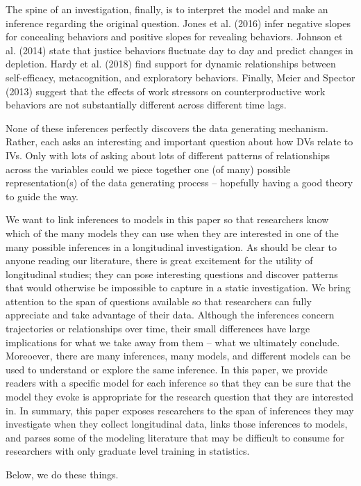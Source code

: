 \documentclass[english,,man]{apa6}
\theoremstyle{definition}
\theoremstyle{definition}
\theoremstyle{definition}
\theoremstyle{remark}
\begin{document}
The spine of an investigation, finally, is to interpret the model and
make an inference regarding the original question. Jones et al. (2016)
infer negative slopes for concealing behaviors and positive slopes for
revealing behaviors. Johnson et al. (2014) state that justice behaviors
fluctuate day to day and predict changes in depletion. Hardy et al.
(2018) find support for dynamic relationships between self-efficacy,
metacognition, and exploratory behaviors. Finally, Meier and Spector
(2013) suggest that the effects of work stressors on counterproductive
work behaviors are not substantially different across different time
lags.

None of these inferences perfectly discovers the data generating
mechanism. Rather, each asks an interesting and important question about
how DVs relate to IVs. Only with lots of asking about lots of different
patterns of relationships across the variables could we piece together
one (of many) possible representation(s) of the data generating process
-- hopefully having a good theory to guide the way.

We want to link inferences to models in this paper so that researchers
know which of the many models they can use when they are interested in
one of the many possible inferences in a longitudinal investigation. As
should be clear to anyone reading our literature, there is great
excitement for the utility of longitudinal studies; they can pose
interesting questions and discover patterns that would otherwise be
impossible to capture in a static investigation. We bring attention to
the span of questions available so that researchers can fully appreciate
and take advantage of their data. Although the inferences concern
trajectories or relationships over time, their small differences have
large implications for what we take away from them -- what we ultimately
conclude. Moreoever, there are many inferences, many models, and
different models can be used to understand or explore the same
inference. In this paper, we provide readers with a specific model for
each inference so that they can be sure that the model they evoke is
appropriate for the research question that they are interested in. In
summary, this paper exposes researchers to the span of inferences they
may investigate when they collect longitudinal data, links those
inferences to models, and parses some of the modeling literature that
may be difficult to consume for researchers with only graduate level
training in statistics.

Below, we do these things.
\end{document}
